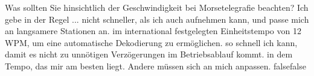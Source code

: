     {Was sollten Sie hinsichtlich der Geschwindigkeit bei Morsetelegrafie beachten? Ich gebe in der Regel ...}
    {nicht schneller, als ich auch aufnehmen kann, und passe mich an langsamere Stationen an.}
    {im international festgelegten Einheitstempo von 12 WPM, um eine automatische Dekodierung zu ermöglichen.}
    {so schnell ich kann, damit es nicht zu unnötigen Verzögerungen im Betriebsablauf kommt.}
    {in dem Tempo, das mir am besten liegt. Andere müssen sich an mich anpassen.}
    {false}{false}